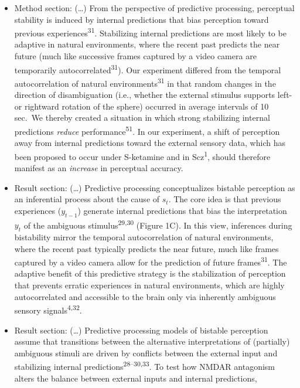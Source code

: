 \documentclass[
]{article}
\begin{document}
\begin{itemize}
\item
  Method section: (\ldots) From the perspective of predictive
  processing, perceptual stability is induced by internal predictions
  that bias perception toward previous experiences\textsuperscript{31}.
  Stabilizing internal predictions are most likely to be adaptive in
  natural environments, where the recent past predicts the near future
  (much like successive frames captured by a video camera are
  temporarily autocorrelated\textsuperscript{31}). Our experiment
  differed from the temporal autocorrelation of natural
  environments\textsuperscript{31} in that random changes in the
  direction of disambiguation (i.e., whether the external stimulus
  supports left- or rightward rotation of the sphere) occurred in
  average intervals of 10 sec.~We thereby created a situation in which
  strong stabilizing internal predictions \emph{reduce}
  performance\textsuperscript{51}. In our experiment, a shift of
  perception away from internal predictions toward the external sensory
  data, which has been proposed to occur under S-ketamine and in
  Scz\textsuperscript{1}, should therefore manifest as an
  \emph{increase} in perceptual accuracy.
\item
  Result section: (\ldots) Predictive processing conceptualizes bistable
  perception as an inferential process about the cause of \(s_t\). The
  core idea is that previous experiences (\(y_{t-1}\)) generate internal
  predictions that bias the interpretation \(y_t\) of the ambiguous
  stimulus\textsuperscript{29,30} (Figure 1C). In this view, inferences
  during bistability mirror the temporal autocorrelation of natural
  environments, where the recent past typically predicts the near
  future, much like frames captured by a video camera allow for the
  prediction of future frames\textsuperscript{31}. The adaptive benefit
  of this predictive strategy is the stabilization of perception that
  prevents erratic experiences in natural environments, which are highly
  autocorrelated and accessible to the brain only via inherently
  ambiguous sensory signals\textsuperscript{4,32}.
\item
  Result section: (\ldots) Predictive processing models of bistable
  perception assume that transitions between the alternative
  interpretations of (partially) ambiguous stimuli are driven by
  conflicts between the external input and stabilizing internal
  predictions\textsuperscript{28--30,33}. To test how NMDAR antagonism
  alters the balance between external inputs and internal predictions,

\end{itemize}
\end{document}
